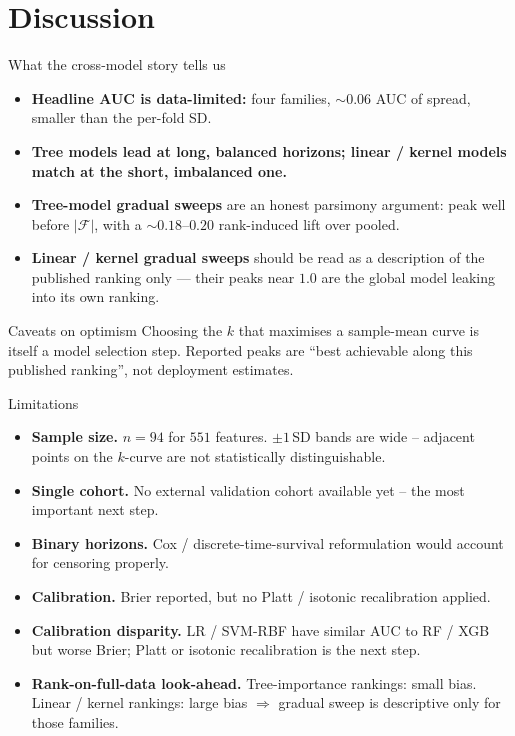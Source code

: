 \documentclass[10pt,aspectratio=169]{beamer}
\begin{document}
\section{Discussion}

\begin{frame}{What the cross-model story tells us}
  \begin{itemize}
    \item \textbf{Headline AUC is data-limited:} four families,
          $\sim 0.06$ AUC of spread, smaller than the per-fold SD.
    \item \textbf{Tree models lead at long, balanced horizons; linear
          / kernel models match at the short, imbalanced one.}
    \item \textbf{Tree-model gradual sweeps} are an honest parsimony
          argument: peak well before $|\mathcal{F}|$, with a $\sim
          0.18$--$0.20$ rank-induced lift over pooled.
    \item \textbf{Linear / kernel gradual sweeps} should be read as a
          description of the published ranking only --- their peaks
          near $1.0$ are the global model leaking into its own
          ranking.
  \end{itemize}
  \begin{block}{Caveats on optimism}
    Choosing the $k$ that maximises a sample-mean curve is itself a model
    selection step. Reported peaks are ``best achievable along this
    published ranking'', not deployment estimates.
  \end{block}
\end{frame}

\begin{frame}{Limitations}
  \begin{itemize}
    \item \textbf{Sample size.} $n=94$ for $551$ features.
          $\pm 1$\,SD bands are wide -- adjacent points on the
          $k$-curve are not statistically distinguishable.
    \item \textbf{Single cohort.} No external validation cohort
          available yet -- the most important next step.
    \item \textbf{Binary horizons.} Cox / discrete-time-survival
          reformulation would account for censoring properly.
    \item \textbf{Calibration.} Brier reported, but no Platt / isotonic
          recalibration applied.
    \item \textbf{Calibration disparity.} LR / SVM-RBF have similar AUC
          to RF / XGB but worse Brier; Platt or isotonic recalibration
          is the next step.
    \item \textbf{Rank-on-full-data look-ahead.} Tree-importance
          rankings: small bias. Linear / kernel rankings: large bias
          $\Rightarrow$ gradual sweep is descriptive only for those
          families.
  \end{itemize}
\end{frame}
\end{document}
